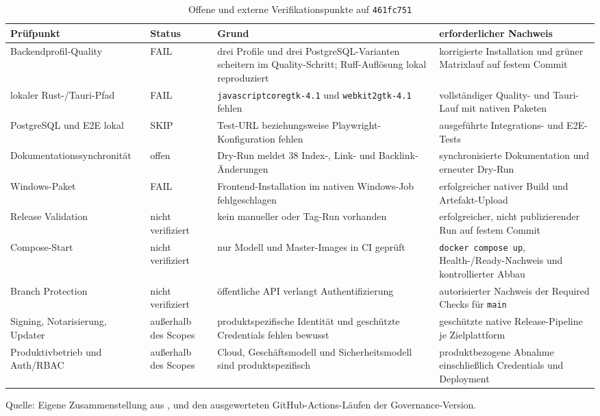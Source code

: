 \begin{table}[H]
  \centering
  \scriptsize
  \renewcommand{\arraystretch}{1.1}
  \caption{Offene und externe Verifikationspunkte auf \texttt{461fc751}}
  \label{tab:external-verification-items}
  \begin{tabularx}{\textwidth}{@{}p{}p{}p{}>{\raggedright\arraybackslash}X@{}}
    \toprule
    \textbf{Prüfpunkt} & \textbf{Status} & \textbf{Grund} & \textbf{erforderlicher Nachweis} \\
    \midrule
    Backendprofil-Quality & FAIL & drei Profile und drei PostgreSQL-Varianten scheitern im Quality-Schritt; Ruff-Auflösung lokal reproduziert & korrigierte Installation und grüner Matrixlauf auf festem Commit \\
    lokaler Rust-/Tauri-Pfad & FAIL & \texttt{javascriptcoregtk-4.1} und \texttt{webkit2gtk-4.1} fehlen & vollständiger Quality- und Tauri-Lauf mit nativen Paketen \\
    PostgreSQL und E2E lokal & SKIP & Test-URL beziehungsweise Playwright-Konfiguration fehlen & ausgeführte Integrations- und E2E-Tests \\
    Dokumentationssynchronität & offen & Dry-Run meldet 38 Index-, Link- und Backlink-Änderungen & synchronisierte Dokumentation und erneuter Dry-Run \\
    Windows-Paket & FAIL & Frontend-Installation im nativen Windows-Job fehlgeschlagen & erfolgreicher nativer Build und Artefakt-Upload \\
    Release Validation & nicht verifiziert & kein manueller oder Tag-Run vorhanden & erfolgreicher, nicht publizierender Run auf festem Commit \\
    Compose-Start & nicht verifiziert & nur Modell und Master-Images in CI geprüft & \texttt{docker compose up}, Health-/Ready-Nachweis und kontrollierter Abbau \\
    Branch Protection & nicht verifiziert & öffentliche API verlangt Authentifizierung & autorisierter Nachweis der Required Checks für \texttt{main} \\
    Signing, Notarisierung, Updater & außerhalb des Scopes & produktspezifische Identität und geschützte Credentials fehlen bewusst & geschützte native Release-Pipeline je Zielplattform \\
    Produktivbetrieb und Auth/RBAC & außerhalb des Scopes & Cloud, Geschäftsmodell und Sicherheitsmodell sind produktspezifisch & produktbezogene Abnahme einschließlich Credentials und Deployment \\
    \bottomrule
  \end{tabularx}
  \smallskip
  {\scriptsize Quelle: Eigene Zusammenstellung aus
  \textcite{kleiveist2026acceptance,kleiveist2026release},
  \textcite{kleiveist2026quality-implementation} und den ausgewerteten
  GitHub-Actions-Läufen der Governance-Version.\par}
\end{table}
